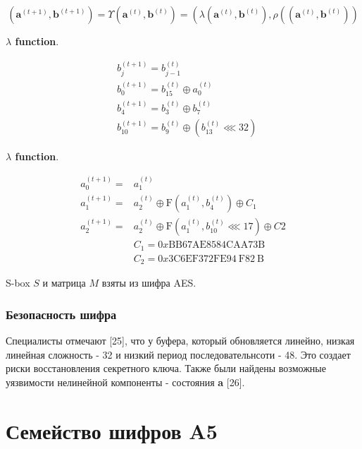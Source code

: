 \documentclass[colorthm]{./civarticle}
\begin{document}
\begin{equation}
    \left(\mathbf{a}^{(t+1)}, \mathbf{b}^{(t+1)}\right) =\Upsilon\left(\mathbf{a}^{(t)}, \mathbf{b}^{(t)}\right) 
=\left(\lambda\left(\mathbf{a}^{(t)}, \mathbf{b}^{(t)}\right), \rho\left(\left(\mathbf{a}^{(t)}, \mathbf{b}^{(t)}\right)\right)\right.
\end{equation}

\textbf{$\lambda$ function}.

\begin{equation}
    \begin{aligned}
& b_j^{(t+1)}=b_{j-1}^{(t)} \\
& b_0^{(t+1)}=b_{15}^{(t)} \oplus a_0^{(t)} \\
& b_4^{(t+1)}=b_3^{(t)} \oplus b_7^{(t)} \\
& b_{10}^{(t+1)}=b_9^{(t)} \oplus\left(b_{13}^{(t)} \lll 32\right)
\end{aligned}
\end{equation}

\textbf{$\lambda$ function}.

\begin{equation}
    \begin{aligned}
a_0^{(t+1)}= & a_1^{(t)} \\
a_1^{(t+1)}= & a_2^{(t)} \oplus \mathrm{F}\left(a_1^{(t)}, b_4^{(t)}\right) \oplus C_1 \\
a_2^{(t+1)}= & a_2^{(t)} \oplus \mathrm{F}\left(a_1^{(t)}, b_{10}^{(t)} \lll 17\right) \oplus C 2 \\
& C_1=0 x \mathrm{BB} 67 \mathrm{AE} 8584 \mathrm{CAA73B} \\
& C_2=0 x 3 \mathrm{C} 6 \mathrm{EF} 372 \mathrm{FE} 94 \mathrm{~F} 82 \mathrm{~B}
\end{aligned}
\end{equation}

S-box $S$ и матрица $M$ взяты из шифра AES.

\subsubsection{Безопасность шифра} 

Специалисты отмечают [25], что у буфера, который обновляется линейно, низкая линейная сложность - 32 и низкий период последовательнсоти - 48. Это создает риски восстановления секретного ключа. Также были найдены возможные уязвимости нелинейной компоненты - состояния \textbf{a} [26].

\section{Семейство шифров A5}
\end{document}
